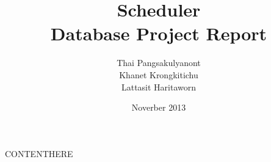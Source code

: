 \documentclass[12pt,a4paper]{article}
\begin{document}
\title{Scheduler \\ Database Project Report}
\author{Thai Pangsakulyanont \\ Khanet Krongkitichu \\ Lattasit Haritaworn}
\date{Noverber 2013}
\maketitle

\tableofcontents

CONTENTHERE
\end{document}
